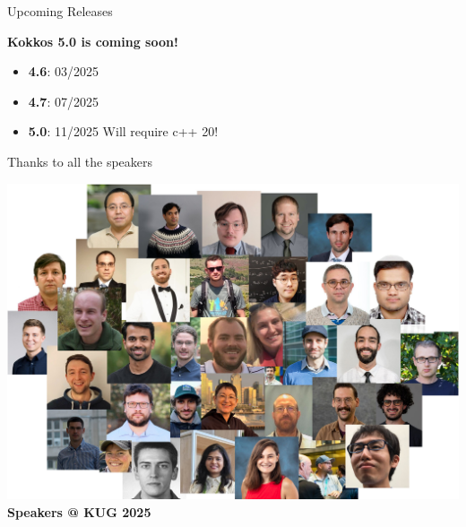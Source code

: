 \begin{frame}[fragile]{Upcoming Releases}
  \begin{center}
\textbf{Kokkos 5.0 is coming soon!}
\vspace{1cm}
  \begin{itemize}
    \item{\textbf{4.6}: 03/2025}
    \item{\textbf{4.7}: \textcolor{black!40!white}{07/2025}}
    \item{\textbf{5.0}: \textcolor{black!40!white}{11/2025} Will require c++ 20!}
  \end{itemize}
  \end{center}
\end{frame}

\begin{frame}[fragile]{Thanks to all the speakers}

  \begin{center}
  \includegraphics[height=0.7\textheight]{mosaic.jpg} 
  \\
  \textbf{Speakers @ KUG 2025}
  \end{center}

\end{frame}
